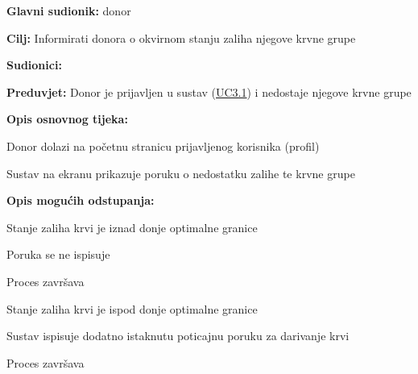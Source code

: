 					
					\noindent {}
					\begin{packed_item}
	
						\item \textbf{Glavni sudionik: }donor
						\item  \textbf{Cilj:} Informirati donora o okvirnom stanju zaliha njegove krvne grupe
						\item  \textbf{Sudionici:} 
						\item  \textbf{Preduvjet:} Donor je prijavljen u sustav (\hyperref[UC3.1]{UC3.1}) i nedostaje njegove krvne grupe
						\item  \textbf{Opis osnovnog tijeka:}
						
						\item[] \begin{packed_enum}
	
							\item Donor dolazi na početnu stranicu prijavljenog korisnika (profil)
	                        \item Sustav na ekranu prikazuje poruku o nedostatku zalihe te krvne grupe

						\end{packed_enum}
						
						\item  \textbf{Opis mogućih odstupanja:}
						
						\item[] \begin{packed_item}
	
							\item[2] Stanje zaliha krvi je iznad donje optimalne granice
							\item[] \begin{packed_enum}
								\item Poruka se ne ispisuje
								\item Proces završava
							\end{packed_enum}
							
							\item[2] Stanje zaliha krvi je ispod donje optimalne granice
							\item[] \begin{packed_enum}
								\item Sustav ispisuje dodatno istaknutu poticajnu poruku za darivanje krvi
								\item Proces završava
							\end{packed_enum}

						\end{packed_item}
						
					\end{packed_item}
					
